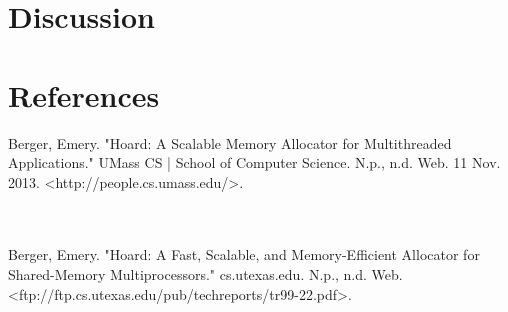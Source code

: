 \documentclass[11pt]{article}
\begin{document}
\section{Discussion}
 

\newpage
\noindent
\section{References}

Berger, Emery. "Hoard: A Scalable Memory Allocator for Multithreaded Applications." UMass CS | School of Computer Science. N.p., n.d. Web. 11 Nov. 2013. <http://people.cs.umass.edu/>.

\\
\\
Berger, Emery. "Hoard: A Fast, Scalable, and Memory-Efficient Allocator for Shared-Memory Multiprocessors." cs.utexas.edu. N.p., n.d. Web. <ftp://ftp.cs.utexas.edu/pub/techreports/tr99-22.pdf>.

\end{document}
